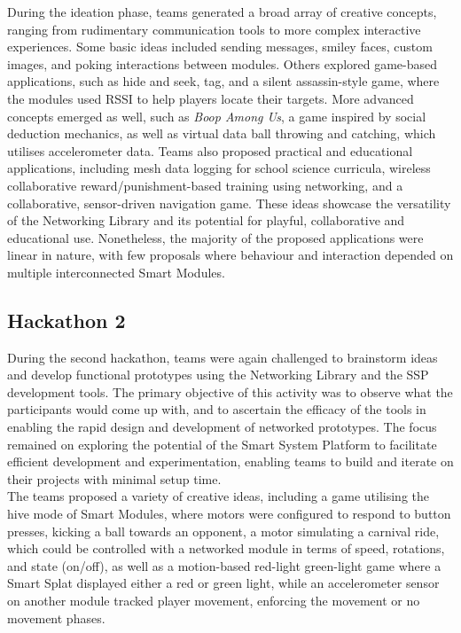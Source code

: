 During the ideation phase, teams generated a broad array of creative concepts, ranging from rudimentary communication tools to more complex interactive experiences. Some basic ideas included sending messages, smiley faces, custom images, and poking interactions between modules. Others explored game-based applications, such as hide and seek, tag, and a silent assassin-style game, where the modules used RSSI to help players locate their targets. More advanced concepts emerged as well, such as \textit{Boop Among Us}, a game inspired by social deduction mechanics, as well as virtual data ball throwing and catching, which utilises accelerometer data. Teams also proposed practical and educational applications, including mesh data logging for school science curricula, wireless collaborative reward/punishment-based training using networking, and a collaborative, sensor-driven navigation game. These ideas showcase the versatility of the Networking Library and its potential for playful, collaborative and educational use. Nonetheless, the majority of the proposed applications were linear in nature, with few proposals where behaviour and interaction depended on multiple interconnected Smart Modules.

\subsection{\label{sec:res_hackathon2}Hackathon 2}

During the second hackathon, teams were again challenged to brainstorm ideas and develop functional prototypes using the Networking Library and the SSP development tools. The primary objective of this activity was to observe what the participants would come up with, and to ascertain the efficacy of the tools in enabling the rapid design and development of networked prototypes. The focus remained on exploring the potential of the Smart System Platform to facilitate efficient development and experimentation, enabling teams to build and iterate on their projects with minimal setup time.\\

The teams proposed a variety of creative ideas, including a game utilising the hive mode of Smart Modules, where motors were configured to respond to button presses, kicking a ball towards an opponent, a motor simulating a carnival ride, which could be controlled with a networked module in terms of speed, rotations, and state (on/off), as well as a motion-based red-light green-light game where a Smart Splat displayed either a red or green light, while an accelerometer sensor on another module tracked player movement, enforcing the movement or no movement phases.

